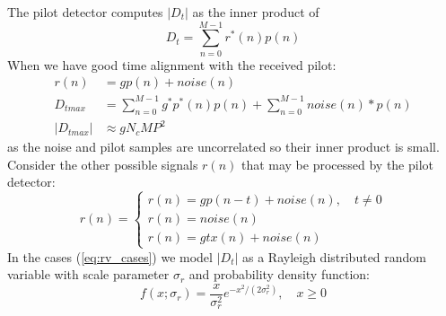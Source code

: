 \documentclass{article}
\begin{document}
The pilot detector computes $|D_t|$ as the inner product of 
\begin{equation}
D_t = \sum_{n=0}^{M-1} r^*(n)p(n)
\end{equation}
When we have good time alignment with the received pilot:
\begin{equation}
\label{eq:dt_peak}
\begin{split}
r(n) &= gp(n) + noise(n) \\
D_{tmax}   &= \sum_{n=0}^{M-1} g^*p^*(n)p(n) + \sum_{n=0}^{M-1} noise(n)*p(n)  \\
|D_{tmax}| &\approx gN_cMP^2
\end{split}
\end{equation}
as the noise and pilot samples are uncorrelated so their inner product is small. Consider the other possible signals $r(n)$ that may be processed by the pilot detector:
\begin{equation}
\label{eq:rv_cases}
r(n) =\begin{cases}
      r(n) = gp(n-t) + noise(n), \quad t \ne 0 \\
      r(n) = noise(n) \\
      r(n) = gtx(n) + noise(n)
	\end{cases}
\end{equation}
In the cases (\ref{eq:rv_cases}) we model $|D_t|$ as a Rayleigh distributed random variable with scale parameter $\sigma_r$ and probability density function:
\begin{equation}
\label{eq:rayliegh_pdf}
f(x;\sigma_r )={\frac {x}{\sigma_r ^{2}}}e^{-x^{2}/(2\sigma_r ^{2})},\quad x\geq 0
\end{equation}
\end{document}
